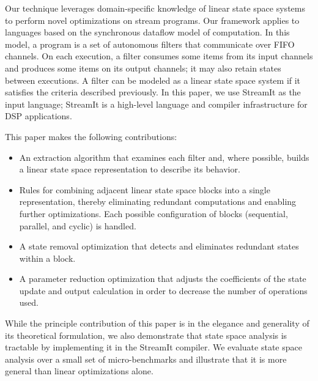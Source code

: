 Our technique leverages domain-specific knowledge of linear state
space systems to perform novel optimizations on stream programs.  Our
framework applies to languages based on the synchronous dataflow model
of computation.  In this model, a program is a set of autonomous
filters that communicate over FIFO channels.  On each execution, a
filter consumes some items from its input channels and produces some
items on its output channels; it may also retain states between
executions.  A filter can be modeled as a linear state space system if
it satisfies the criteria described previously.  In this paper, we use
StreamIt as the input language; StreamIt is a high-level language and
compiler infrastructure for DSP applications.

This paper makes the following contributions:

\begin{itemize}

\vspace{\itemshrink} \item An extraction algorithm that examines each
filter and, where possible, builds a linear state space representation
to describe its behavior.

\vspace{\itemshrink} \item Rules for combining adjacent linear state space
blocks into a single representation, thereby eliminating redundant
computations and enabling further optimizations.  Each possible
configuration of blocks (sequential, parallel, and cyclic) is handled.

\vspace{\itemshrink} \item A state removal optimization that detects
and eliminates redundant states within a block.

\vspace{\itemshrink} \item A parameter reduction optimization that
adjusts the coefficients of the state update and output calculation in
order to decrease the number of operations used.

\vspace{\itemshrink} \end{itemize}

While the principle contribution of this paper is in the elegance and
generality of its theoretical formulation, we also demonstrate that
state space analysis is tractable by implementing it in the StreamIt
compiler.  We evaluate state space analysis over a small set of
micro-benchmarks and illustrate that it is more general than linear
optimizations alone.

